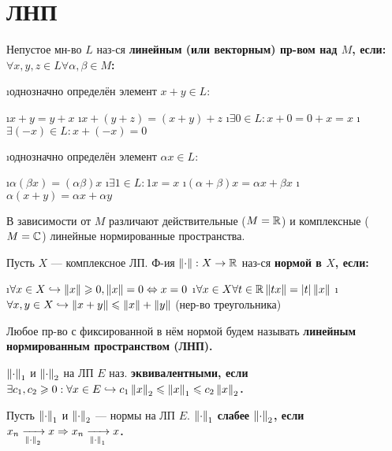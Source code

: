 \section{ЛНП}

\begin{defn}
Непустое мн-во $L$ наз-ся \bf{линейным} (или \bf{векторным}) пр-вом над $M$, если:
$\forall x, y, z \in L \forall \alpha, \beta \in M$:
\begin{enumerate}
\i однозначно определён элемент $x+y \in L$:
 \begin{enumerate}
 \i $x+y = y+x$
 \i $x+(y+z) = (x+y)+z$
 \i $\exists 0 \in L: x+0 = 0+x = x$
 \i $\exists (-x) \in L: x+(-x) = 0$
 \end{enumerate}
\i однозначно определён элемент $\alpha x \in L$:
 \begin{enumerate}
 \i $\alpha(\beta x) = (\alpha \beta)x$
 \i $\exists 1 \in L: 1x=x$
 \i $(\alpha+\beta)x = \alpha x + \beta x$
 \i $\alpha(x+y) = \alpha x + \alpha y$
 \end{enumerate}
\end{enumerate}
В зависимости от $M$ различают действительные ($M=\mathbb{R}$) и комплексные ($M=\mathbb{C}$) линейные нормированные пространства.
\end{defn}

\begin{defn}
Пусть $X$ --- комплексное ЛП. Ф-ия $\left\lVert\cdot\right\rVert: X \rightarrow \mathbb{R}$ наз-ся \bf{нормой} в $X$, если:
\begin{enumerate}
\i $\forall x \in X \hookrightarrow \left\lVert x\right\rVert \geqslant 0, \left\lVert x\right\rVert = 0 \Leftrightarrow x = 0$
\i $\forall x \in X \forall t \in \mathbb{R} \left\lVert tx\right\rVert = |t| \left\lVert x\right\rVert$
\i $\forall x, y \in X \hookrightarrow \left\lVert x+y\right\rVert \leqslant \left\lVert x\right\rVert + \left\lVert y\right\rVert$ (нер-во треугольника)
\end{enumerate}
Любое пр-во с фиксированной в нём нормой будем называть \bf{линейным нормированным пространством (ЛНП)}.
\end{defn}

\begin{defn}
$\left\lVert\cdot\right\rVert_1$ и $\left\lVert\cdot\right\rVert_2$ на ЛП $E$ наз. \bf{эквивалентными}, если $\exists c_1, c_2 \geqslant 0: \forall x \in E \hookrightarrow c_1 \left\lVert x\right\rVert_2 \leqslant \left\lVert x\right\rVert_1 \leqslant c_2 \left\lVert x\right\rVert_2$.
\end{defn}

\begin{defn}
Пусть $\left\lVert\cdot\right\rVert_1$ и $\left\lVert\cdot\right\rVert_2$ --- нормы на ЛП $E$. $\left\lVert\cdot\right\rVert_1$ \bf{слабее} $\left\lVert\cdot\right\rVert_2$, если $x_n \xrightarrow[\left\lVert\cdot\right\rVert_2]{} x \Rightarrow x_n \xrightarrow[\left\lVert\cdot\right\rVert_1]{} x$.
\end{defn}

